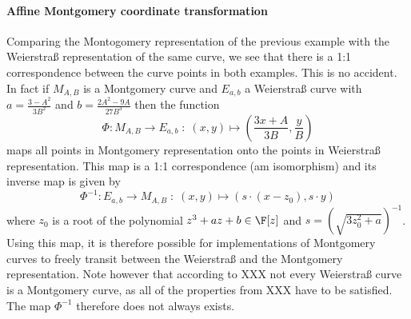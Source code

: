 \paragraph{Affine Montgomery coordinate transformation} Comparing the Montogomery representation of the previous example with the Weierstraß representation of the same curve, we see that there is a 1:1 correspondence between the curve points in both examples. This is no accident. In fact if $M_{A,B}$ is a Montgomery curve and $E_{a,b}$ a Weierstraß curve with $a = \frac{3-A^2}{3B^2}$ and $b= \frac{2A^2 -9A}{27B^3}$ then the function
\begin{equation}
\Phi: M_{A,B} \to E_{a,b}\; : \; (x,y) \mapsto \left(\frac{3x + A}{3B}, \frac{y}{B}\right)
\end{equation}
maps all points in Montgomery representation onto the points in Weierstraß representation. This map is a 1:1 correspondence (am isomorphism) and its inverse map is given by
\begin{equation}
\Phi^{-1}: E_{a,b} \to M_{A,B}\; : \; (x,y) \mapsto \left(s\cdot(x-z_0), s\cdot y\right)
\end{equation}
where $z_0$ is a root of the polynomial $z^3 + a z + b \in \F[z]$ and $s=({\sqrt{3z_0^{2}+a}})^{-1}$. Using this map, it is therefore possible for implementations of Montgomery curves to freely transit between the Weierstraß and the Montgomery representation. Note however that according to XXX not every Weierstraß curve is a Montgomery curve, as all of the properties from XXX have to be satisfied. The map $\Phi^{-1}$ therefore does not always exists. 

